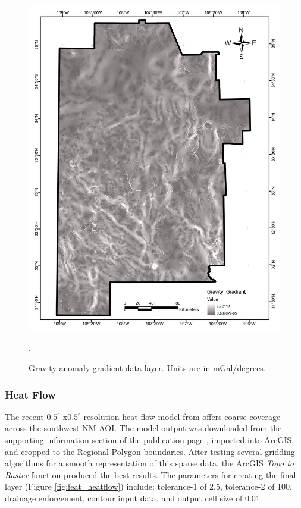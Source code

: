 \begin{figure}[!htp]
\centering
\includegraphics[scale=.50]{templates/images/Figure-GravityGradient.pdf}
\caption[Gravity anomaly gradient data layer]{Gravity anomaly gradient data layer. Units are in mGal/degrees.}.
\label{fig:feat_gravity_gradient}
\end{figure}

\subsubsection{Heat Flow}

The recent $0.5^\circ$ x$0.5^\circ$ resolution heat flow model from \citet{lucazeau_analysis_2019} offers coarse coverage across the southwest NM AOI. The model output was downloaded from the supporting information section of the publication page \citep{lucazeau_analysis_2019}, imported into ArcGIS, and cropped to the Regional Polygon boundaries. After testing several gridding algorithms for a smooth representation of this sparse data, the ArcGIS \textit{Topo to Raster} function produced the best results. The parameters for creating the final layer (Figure \ref{fig:feat_heatflow}) include: tolerance-1 of 2.5, tolerance-2 of 100, drainage enforcement, contour input data, and output cell size of 0.01. 

